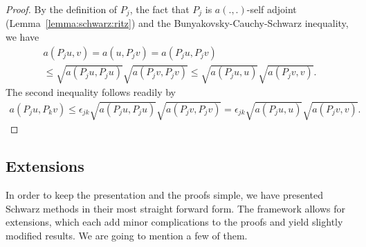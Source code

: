\begin{proof}
  By the definition of $P_j$, the fact that $P_j$ is $a(.,.)$-self
  adjoint (Lemma~\ref{lemma:schwarz:ritz}) and the Bunyakovsky-Cauchy-Schwarz
  inequality, we have
  \begin{multline*}
    a(P_j u,v) = a(u, P_j v) = a(P_j u, P_j v)
    \\
    \le \sqrt{a(P_j u,P_j u)} \sqrt{a(P_j v,P_j v)}
    \le \sqrt{a(P_j u,u)} \sqrt{a(P_j v,v)}.
  \end{multline*}
  The second inequality follows readily by
  \begin{gather*}
    a(P_j u,P_k v)
    \le \epsilon_{jk}\sqrt{a(P_j u,P_j u)} \sqrt{a(P_j v,P_j v)}
    = \epsilon_{jk}\sqrt{a(P_j u,u)} \sqrt{a(P_j v,v)}.
  \end{gather*}
\end{proof}

\begin{theorem}
  
\end{theorem}

\subsection{Extensions}

\begin{intro}
  In order to keep the presentation and the proofs simple, we have
  presented Schwarz methods in their most straight forward form. The
  framework allows for extensions, which each add minor
  complications to the proofs and yield slightly modified results. We
  are going to mention a few of them.
\end{intro}

